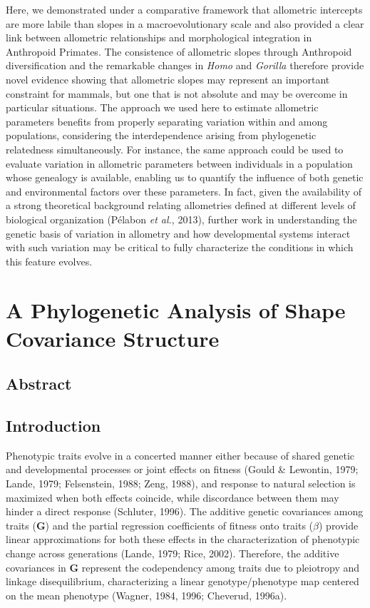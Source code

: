 \documentclass[12pt,twoside]{report}
\begin{document}
Here, we demonstrated under a comparative framework that allometric
intercepts are more labile than slopes in a macroevolutionary scale and
also provided a clear link between allometric relationships and
morphological integration in Anthropoid Primates. The consistence of
allometric slopes through Anthropoid diversification and the remarkable
changes in \emph{Homo} and \emph{Gorilla} therefore provide novel
evidence showing that allometric slopes may represent an important
constraint for mammals, but one that is not absolute and may be overcome
in particular situations. The approach we used here to estimate
allometric parameters benefits from properly separating variation within
and among populations, considering the interdependence arising from
phylogenetic relatedness simultaneously. For instance, the same approach
could be used to evaluate variation in allometric parameters between
individuals in a population whose genealogy is available, enabling us to
quantify the influence of both genetic and environmental factors over
these parameters. In fact, given the availability of a strong
theoretical background relating allometries defined at different levels
of biological organization (Pélabon \emph{et al.}, 2013), further work
in understanding the genetic basis of variation in allometry and how
developmental systems interact with such variation may be critical to
fully characterize the conditions in which this feature evolves.

\newpage
\chapter{A Phylogenetic Analysis of Shape Covariance Structure}
\label{ch:ppca}

\section{Abstract}\label{abstract-2}

\section{Introduction}\label{introduction-2}

Phenotypic traits evolve in a concerted manner either because of shared
genetic and developmental processes or joint effects on fitness (Gould
\& Lewontin, 1979; Lande, 1979; Felsenstein, 1988; Zeng, 1988), and
response to natural selection is maximized when both effects coincide,
while discordance between them may hinder a direct response (Schluter,
1996). The additive genetic covariances among traits ($\mathbf{G}$) and
the partial regression coefficients of fitness onto traits ($\beta$)
provide linear approximations for both these effects in the
characterization of phenotypic change across generations (Lande, 1979;
Rice, 2002). Therefore, the additive covariances in $\mathbf{G}$
represent the codependency among traits due to pleiotropy and linkage
disequilibrium, characterizing a linear genotype/phenotype map centered
on the mean phenotype (Wagner, 1984, 1996; Cheverud, 1996a).
\end{document}
